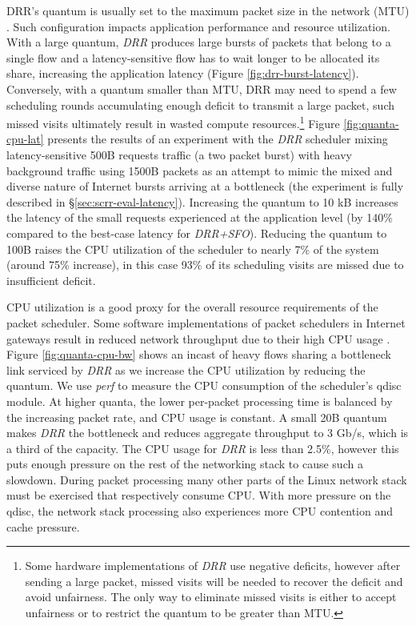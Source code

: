 


DRR's quantum is usually set to the maximum packet size in the network
(MTU) \cite{drr}. Such configuration impacts application performance
and resource utilization.  With a large quantum, \textit{DRR} produces large
bursts of packets that belong to a single flow and a latency-sensitive
flow has to wait longer to be allocated its share, increasing the
application latency (Figure \ref{fig:drr-burst-latency}). Conversely,
with a quantum smaller than MTU, DRR may need to spend a few
scheduling rounds accumulating enough deficit to transmit a large
packet, such missed visits ultimately result in wasted compute
resources.\footnote{Some hardware implementations of \textit{DRR} use negative
deficits, however after sending a large packet, missed visits will be
needed to recover the deficit and avoid unfairness. The only way to
eliminate missed visits is either to accept unfairness or to restrict
the quantum to be greater than MTU.}  Figure \ref{fig:quanta-cpu-lat}
presents the results of an experiment with the \textit{DRR} scheduler mixing
latency-sensitive 500B requests traffic (a two packet burst) with
heavy background traffic using 1500B packets as an attempt to mimic
the mixed and diverse nature of Internet bursts arriving at
a bottleneck (the experiment is fully described in
\S\ref{sec:scrr-eval-latency}).  Increasing the quantum to 10 kB increases
the latency of the small requests experienced at the application level
(by 140\% compared to the best-case latency for \textit{DRR+SFO}). Reducing the
quantum to 100B raises the CPU utilization of the scheduler to nearly
7\% of the system (around 75\% increase), in this case 93\% of its
scheduling visits are missed due to insufficient deficit.


CPU utilization is a good proxy for the overall resource requirements
of the packet scheduler. Some software implementations of packet
schedulers in Internet gateways result in reduced network throughput
due to their high CPU usage \cite{cake-perf1, cake-perf2}.
Figure \ref{fig:quanta-cpu-bw} shows an incast of heavy flows sharing
a bottleneck link serviced by \textit{DRR} as we increase the CPU
utilization by reducing the quantum. We use \textit{perf} to
measure the CPU consumption of the scheduler's qdisc module. At
higher quanta, the lower per-packet processing time is balanced by the
increasing packet rate, and CPU usage is constant. A small 20B
quantum makes \textit{DRR} the bottleneck and reduces aggregate
throughput to 3 Gb/s, which is a third of the capacity. The CPU usage for
\textit{DRR} is less than 2.5\%, however this puts enough pressure on
the rest of the networking stack to cause such a slowdown. During
packet processing many other parts of the Linux network stack must be
exercised that respectively consume CPU. With more pressure on the
qdisc, the network stack processing also experiences more CPU
contention and cache pressure.

